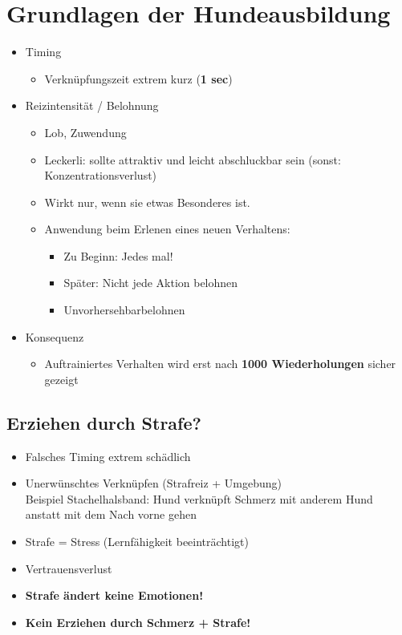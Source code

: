 \section{Grundlagen der Hundeausbildung}

\begin{itemize}
    \item Timing
    \begin{itemize}
        \item Verknüpfungszeit extrem kurz (\textbf{1 sec})
    \end{itemize}
    \item Reizintensität / Belohnung
        \begin{itemize}
            \item Lob, Zuwendung
            \item Leckerli: sollte attraktiv und leicht abschluckbar sein (sonst: Konzentrationsverlust)
            \item Wirkt nur, wenn sie etwas Besonderes ist.
            \item Anwendung beim Erlenen eines neuen Verhaltens:
                \begin{itemize}
                    \item Zu Beginn: Jedes mal!
                    \item Später: Nicht jede Aktion belohnen
                    \item \glqq Unvorhersehbar\grqq belohnen
                \end{itemize}
        \end{itemize}
    \item Konsequenz
        \begin{itemize}
            \item Auftrainiertes Verhalten wird erst nach \textbf{1000 Wiederholungen} sicher gezeigt
        \end{itemize}
\end{itemize}

    \subsection{Erziehen durch Strafe?}
        \begin{itemize}
            \item Falsches Timing extrem schädlich
            \item Unerwünschtes Verknüpfen (Strafreiz + Umgebung) \\
                  Beispiel Stachelhalsband: Hund verknüpft Schmerz mit anderem Hund anstatt mit dem \glqq Nach vorne gehen\grqq
            \item Strafe = Stress (Lernfähigkeit beeinträchtigt)
            \item Vertrauensverlust
            \item \textbf{Strafe ändert keine Emotionen!}
            \item \textbf{Kein Erziehen durch Schmerz + Strafe!}
        \end{itemize}

